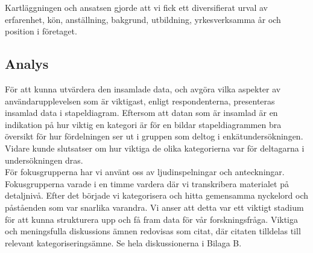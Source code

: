 Kartläggningen och ansatsen gjorde att vi fick ett diversifierat urval av erfarenhet, kön, anställning, bakgrund, utbildning, yrkesverksamma år och position i företaget. 

\subsection{Analys} 
För att kunna utvärdera den insamlade data, och avgöra vilka aspekter av användarupplevelsen som är viktigast, enligt respondenterna, presenteras insamlad data i stapeldiagram. Eftersom att datan som är insamlad är en indikation på hur viktig en kategori är för en bildar stapeldiagrammen bra översikt för hur fördelningen ser ut i gruppen som deltog i enkätundersökningen. Vidare kunde slutsatser om hur viktiga de olika kategorierna var för deltagarna i undersökningen dras. 
\\

För fokusgrupperna har vi använt oss av ljudinspelningar och anteckningar. Fokusgrupperna varade i en timme vardera där vi transkribera materialet på detaljnivå. Efter det började vi kategorisera och hitta gemensamma nyckelord och påståenden som var snarlika varandra. Vi anser att detta var ett viktigt stadium för att kunna strukturera upp och få fram data för vår forskningsfråga. Viktiga och meningsfulla diskussions ämnen redovisas som citat, där citaten tilldelas till relevant kategoriseringsämne. Se hela diskussionerna i Bilaga B.
\newline


